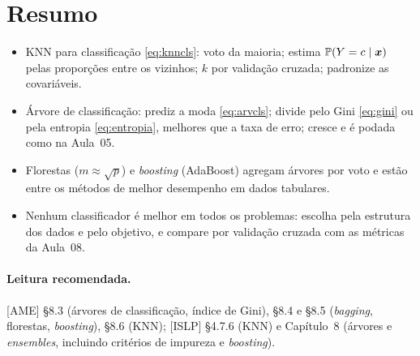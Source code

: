 \documentclass[11pt,a4paper]{article}
\begin{document}
\section*{Resumo}
\begin{itemize}[leftmargin=1.4cm]
  \item KNN para classificação \eqref{eq:knncls}: voto da maioria; estima
        $\mathbb{P}(Y=c\mid\bm{x})$ pelas proporções entre os vizinhos; $k$ por validação
        cruzada; padronize as covariáveis.
  \item Árvore de classificação: prediz a moda \eqref{eq:arvcls}; divide pelo Gini
        \eqref{eq:gini} ou pela entropia \eqref{eq:entropia}, melhores que a taxa de
        erro; cresce e é podada como na Aula~05.
  \item Florestas ($m\approx\sqrt p$) e \emph{boosting} (AdaBoost) agregam árvores por
        voto e estão entre os métodos de melhor desempenho em dados tabulares.
  \item Nenhum classificador é melhor em todos os problemas: escolha pela estrutura
        dos dados e pelo objetivo, e compare por validação cruzada com as métricas da
        Aula~08.
\end{itemize}

\paragraph{Leitura recomendada.} [AME] §8.3 (árvores de classificação, índice de
Gini), §8.4 e §8.5 (\emph{bagging}, florestas, \emph{boosting}), §8.6 (KNN); [ISLP]
§4.7.6 (KNN) e Capítulo~8 (árvores e \emph{ensembles}, incluindo critérios de
impureza e \emph{boosting}).
\end{document}
